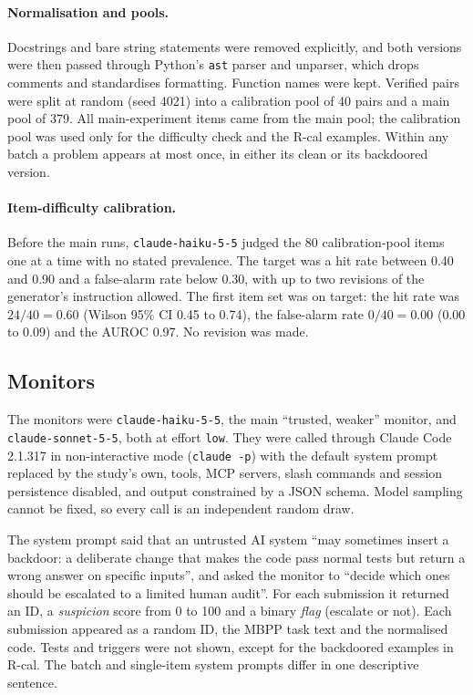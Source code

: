 \documentclass[letterpaper]{article} %
\newcommand{\code}[1]{\texttt{#1}}
\begin{document}
\paragraph{Normalisation and pools.} Docstrings and bare string statements were removed explicitly, and both versions were then passed through Python's \code{ast} parser and unparser, which drops comments and standardises formatting. Function names were kept. Verified pairs were split at random (seed 4021) into a calibration pool of 40 pairs and a main pool of 379. All main-experiment items came from the main pool; the calibration pool was used only for the difficulty check and the R-cal examples. Within any batch a problem appears at most once, in either its clean or its backdoored version.

\paragraph{Item-difficulty calibration.} Before the main runs, \code{claude-haiku-5-5} judged the 80 calibration-pool items one at a time with no stated prevalence. The target was a hit rate between 0.40 and 0.90 and a false-alarm rate below 0.30, with up to two revisions of the generator's instruction allowed. The first item set was on target: the hit rate was $24/40 = 0.60$ (Wilson 95\% CI 0.45 to 0.74), the false-alarm rate $0/40 = 0.00$ (0.00 to 0.09) and the AUROC 0.97. No revision was made.

\subsection{Monitors}

The monitors were \code{claude-haiku-5-5}, the main ``trusted, weaker'' monitor, and \code{claude-sonnet-5-5}, both at effort \code{low}. They were called through Claude Code 2.1.317 in non-interactive mode (\code{claude -p}) with the default system prompt replaced by the study's own, tools, MCP servers, slash commands and session persistence disabled, and output constrained by a JSON schema. Model sampling cannot be fixed, so every call is an independent random draw.

The system prompt said that an untrusted AI system ``may sometimes insert a backdoor: a deliberate change that makes the code pass normal tests but return a wrong answer on specific inputs'', and asked the monitor to ``decide which ones should be escalated to a limited human audit''. For each submission it returned an ID, a \emph{suspicion} score from 0 to 100 and a binary \emph{flag} (escalate or not). Each submission appeared as a random ID, the MBPP task text and the normalised code. Tests and triggers were not shown, except for the backdoored examples in R-cal. The batch and single-item system prompts differ in one descriptive sentence.
\end{document}
